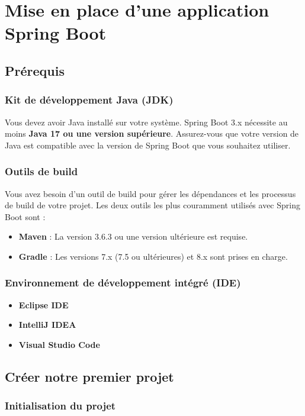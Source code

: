 \documentclass{article}
\begin{document}
\section{Mise en place d'une application Spring Boot} 

\subsection{Prérequis} 

\subsubsection{Kit de développement Java (JDK) }
Vous devez avoir Java installé sur votre système. Spring Boot 3.x nécessite au moins \textbf{Java 17 ou une version supérieure}. Assurez-vous que votre version de Java est compatible avec la version de Spring Boot que vous souhaitez utiliser.

\subsubsection{Outils de build} 
Vous avez besoin d'un outil de build pour gérer les dépendances et les processus de build de votre projet. Les deux outils les plus couramment utilisés avec Spring Boot sont : 
\begin{itemize}
    \item \textbf{Maven} : La version 3.6.3 ou une version ultérieure est requise.
    \item \textbf{Gradle} : Les versions 7.x (7.5 ou ultérieures) et 8.x sont prises en charge.
\end{itemize}

\subsubsection{Environnement de développement intégré (IDE)} 
\begin{itemize}
    \item \textbf{Eclipse IDE}
    \item \textbf{IntelliJ IDEA}
    \item \textbf{Visual Studio Code}
\end{itemize}

\subsection{Créer notre premier projet}
\subsubsection{Initialisation du projet}
\end{document}
